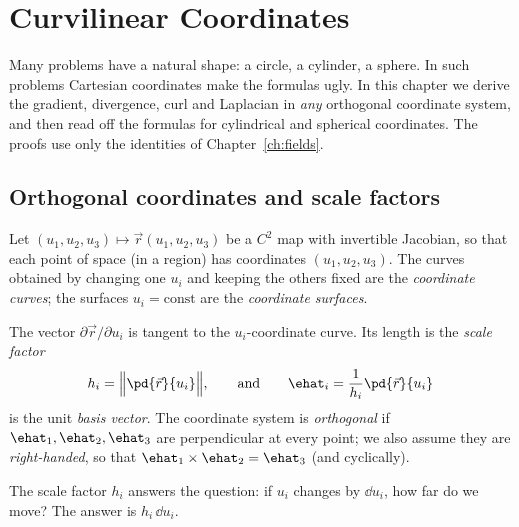 \chapter{Curvilinear Coordinates}
\label{ch:curvilinear}

Many problems have a natural shape: a circle, a cylinder, a sphere. In such problems Cartesian coordinates make the formulas ugly. In this chapter we derive the gradient, divergence, curl and Laplacian in \emph{any} orthogonal coordinate system, and then read off the formulas for cylindrical and spherical coordinates. The proofs use only the identities of Chapter~\ref{ch:fields}.

\section{Orthogonal coordinates and scale factors}

Let $(u_1,u_2,u_3)\mapsto\vec r(u_1,u_2,u_3)$ be a $C^2$ map with invertible Jacobian, so that each point of space (in a region) has coordinates $(u_1,u_2,u_3)$. The curves obtained by changing one $u_i$ and keeping the others fixed are the \emph{coordinate curves}; the surfaces $u_i=\text{const}$ are the \emph{coordinate surfaces}.

\begin{definition}
The vector $\partial\vec r/\partial u_i$ is tangent to the $u_i$-coordinate curve. Its length is the \emph{scale factor}
\[
h_i=\Bigl\lVert\pd{\vec r}{u_i}\Bigr\rVert,\qquad\text{and}\qquad\ehat_i=\frac1{h_i}\pd{\vec r}{u_i}
\]
is the unit \emph{basis vector}. The coordinate system is \emph{orthogonal} if $\ehat_1,\ehat_2,\ehat_3$ are perpendicular at every point; we also assume they are \emph{right-handed}, so that $\ehat_1\times\ehat_2=\ehat_3$ (and cyclically).
\end{definition}

The scale factor $h_i$ answers the question: if $u_i$ changes by $\dd u_i$, how far do we move? The answer is $h_i\,\dd u_i$.

